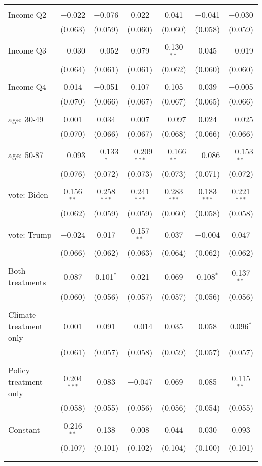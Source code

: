 \begin{tabular}{@{\extracolsep{5pt}}lcccccc}
  & & & & & & \\ 
 Income Q2 & $-$0.022 & $-$0.076 & 0.022 & 0.041 & $-$0.041 & $-$0.030 \\ 
  & (0.063) & (0.059) & (0.060) & (0.060) & (0.058) & (0.059) \\ 
  & & & & & & \\ 
 Income Q3 & $-$0.030 & $-$0.052 & 0.079 & 0.130$^{**}$ & 0.045 & $-$0.019 \\ 
  & (0.064) & (0.061) & (0.061) & (0.062) & (0.060) & (0.060) \\ 
  & & & & & & \\ 
 Income Q4 & 0.014 & $-$0.051 & 0.107 & 0.105 & 0.039 & $-$0.005 \\ 
  & (0.070) & (0.066) & (0.067) & (0.067) & (0.065) & (0.066) \\ 
  & & & & & & \\ 
 age: 30-49 & 0.001 & 0.034 & 0.007 & $-$0.097 & 0.024 & $-$0.025 \\ 
  & (0.070) & (0.066) & (0.067) & (0.068) & (0.066) & (0.066) \\ 
  & & & & & & \\ 
 age: 50-87 & $-$0.093 & $-$0.133$^{*}$ & $-$0.209$^{***}$ & $-$0.166$^{**}$ & $-$0.086 & $-$0.153$^{**}$ \\ 
  & (0.076) & (0.072) & (0.073) & (0.073) & (0.071) & (0.072) \\ 
  & & & & & & \\ 
 vote: Biden & 0.156$^{**}$ & 0.258$^{***}$ & 0.241$^{***}$ & 0.283$^{***}$ & 0.183$^{***}$ & 0.221$^{***}$ \\ 
  & (0.062) & (0.059) & (0.059) & (0.060) & (0.058) & (0.058) \\ 
  & & & & & & \\ 
 vote: Trump & $-$0.024 & 0.017 & 0.157$^{**}$ & 0.037 & $-$0.004 & 0.047 \\ 
  & (0.066) & (0.062) & (0.063) & (0.064) & (0.062) & (0.062) \\ 
  & & & & & & \\ 
 Both treatments & 0.087 & 0.101$^{*}$ & 0.021 & 0.069 & 0.108$^{*}$ & 0.137$^{**}$ \\ 
  & (0.060) & (0.056) & (0.057) & (0.057) & (0.056) & (0.056) \\ 
  & & & & & & \\ 
 Climate treatment only & 0.001 & 0.091 & $-$0.014 & 0.035 & 0.058 & 0.096$^{*}$ \\ 
  & (0.061) & (0.057) & (0.058) & (0.059) & (0.057) & (0.057) \\ 
  & & & & & & \\ 
 Policy treatment only & 0.204$^{***}$ & 0.083 & $-$0.047 & 0.069 & 0.085 & 0.115$^{**}$ \\ 
  & (0.058) & (0.055) & (0.056) & (0.056) & (0.054) & (0.055) \\ 
  & & & & & & \\ 
 Constant & 0.216$^{**}$ & 0.138 & 0.008 & 0.044 & 0.030 & 0.093 \\ 
  & (0.107) & (0.101) & (0.102) & (0.104) & (0.100) & (0.101) \\ 
  & & & & & & \\ 
\hline \\[-1.8ex] 


\end{tabular}
